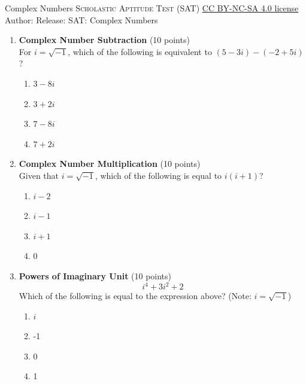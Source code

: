 \newpage\handout
{Complex Numbers}
{\textsc{Scholastic Aptitude Test (SAT)}}
{\href{https://creativecommons.org/licenses/by-nc-sa/4.0/}{CC BY-NC-SA 4.0 license}}
{Author: \BookAuthor}{Release: \generatedOn}
{SAT: Complex Numbers}


\begin{enumerate}
  \item \textbf{Complex Number Subtraction} (10 points)\\
  For $i=\sqrt{-1}$, which of the following is equivalent to $(5-3 i)-(-2+5 i)$?
  \begin{enumerate}[label=(\Alph*)]
    \item $3-8 i$
    \item $3+2 i$
    \item $7-8 i$
    \item $7+2 i$
  \end{enumerate}
  \begin{subanswer}
  \end{subanswer}

  \item \textbf{Complex Number Multiplication} (10 points)\\
  Given that $i=\sqrt{-1}$, which of the following is equal to $i(i+1)$?
  \begin{enumerate}[label=(\Alph*)]
    \item $i-2$
    \item $i-1$
    \item $i+1$
    \item 0
  \end{enumerate}
  \begin{subanswer}
  \end{subanswer}

  \item \textbf{Powers of Imaginary Unit} (10 points)\\
  \[
  i^4+3 i^2+2
  \]
  Which of the following is equal to the expression above? (Note: $i=\sqrt{-1}$)
  \begin{enumerate}[label=(\Alph*)]
    \item $i$
    \item -1
    \item 0
    \item 1
  \end{enumerate}
  \begin{subanswer}
  \end{subanswer}


\end{enumerate}
